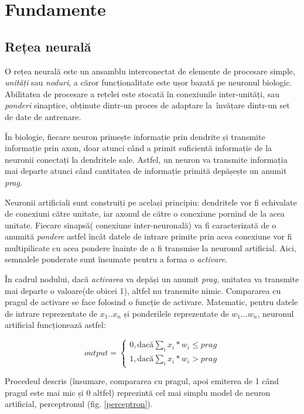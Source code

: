 \chapter{Fundamente}


\section{Rețea neurală}
O rețea neurală este un ansamblu interconectat de elemente de procesare simple, \textit{unități} sau \textit{noduri}, a căror funcționalitate este ușor bazată pe neuronul biologic. Abilitatea de procesare a rețelei este stocată în conexiunile inter-unități, sau \textit{ponderi} sinaptice, obținute dintr-un proces de adaptare la\ învățare dintr-un set de date de antrenare.\cite{Gurney:1997:INN:523781}

În biologie, fiecare neuron primește informație prin dendrite și transmite  informație prin axon, doar atunci când a primit suficientă informație de la neuronii conectați la dendritele sale. Astfel, un neuron va transmite informația mai departe atunci când cantitatea de informație primită depășește un anumit \textit{prag}.

Neuronii artificiali sunt construiți pe același principiu: dendritele vor fi echivalate de conexiuni către unitate, iar axonul de către o conexiune pornind de la acea unitate. Fiecare sinapsă( conexiune inter-neuronală) va fi caracterizată de o anumită \textit{pondere} astfel încât datele de intrare primite prin acea conexiune vor fi multipilicate cu acea pondere înainte de a fi transmise la neuronul artificial. Aici, semnalele ponderate sunt însumate pentru a forma o \textit{activare}.

În cadrul nodului, dacă \textit{activarea} va depăși un anumit \textit{prag}, unitatea va transmite mai departe o valoare(de obicei 1), altfel nu transmite nimic. Compararea cu pragul de activare se face folosind o funcție de activare. Matematic, pentru datele de intrare reprezentate de $x_1 .. x_n$ și ponderilele reprezentate de $w_1 ... w_n$, neuronul artificial funcționează astfel: 

\[
output =
\begin{cases} 
  0, \text{dacă} \sum_{i} x_i*w_i \leq prag \\
  1, \text{dacă}  \sum_{i} x_i*w_i > prag 
\end{cases}
\]     

Procedeul descris (însumare, compararea cu pragul, apoi emiterea de 1 când pragul este mai mic și 0 altfel) reprezintă cel mai simplu model de neuron artificial, perceptronul (fig. \ref{perceptron}). 

